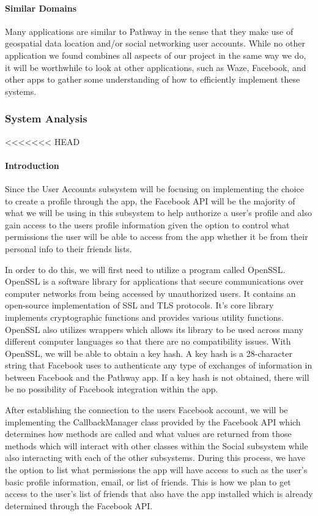 \documentclass{article}
\begin{document}
\paragraph{Similar Domains}
Many applications are similar to Pathway in the sense that they make use of geospatial data location and/or social networking user accounts. While no other application we found combines all aspects of our project in the same way we do, it will be worthwhile to look at other applications, such as Waze, Facebook, and other apps to gather some understanding of how to efficiently implement these systems.

\subsubsection{System Analysis}
<<<<<<< HEAD
\paragraph{Introduction}
Since the User Accounts subsystem will be focusing on implementing the choice to create a profile through the app, the Facebook API will be the majority of what we will be using in this subsystem to help authorize a user’s profile and also gain access to the users profile information given the option to control what permissions the user will be able to access from the app whether it be from their personal info to their friends lists.
	
In order to do this, we will first need to utilize a program called OpenSSL. OpenSSL is a software library for applications that secure communications over computer networks from being accessed by unauthorized users. It contains an open-source implementation of SSL and TLS protocols. It's core library implements cryptographic functions and provides various utility functions. OpenSSL also utilizes wrappers which allows its library to be used across many different computer languages so that there are no compatibility issues. With OpenSSL, we will be able to obtain a key hash. A key hash is a 28-character string that Facebook uses to authenticate any type of exchanges of information in between Facebook and the Pathway app. If a key hash is not obtained, there will be no possibility of Facebook integration within the app. 

After establishing the connection to the users Facebook account, we will be implementing the CallbackManager class provided by the Facebook API which determines how methods are called and what values are returned from those methods which will interact with other classes within the Social subsystem while also interacting with each of the other subsystems. During this process, we have the option to list what permissions the app will have access to such as the user's basic profile information, email, or list of friends. This is how we plan to get access to the user's list of friends that also have the app installed which is already determined through the Facebook API.
\end{document}

